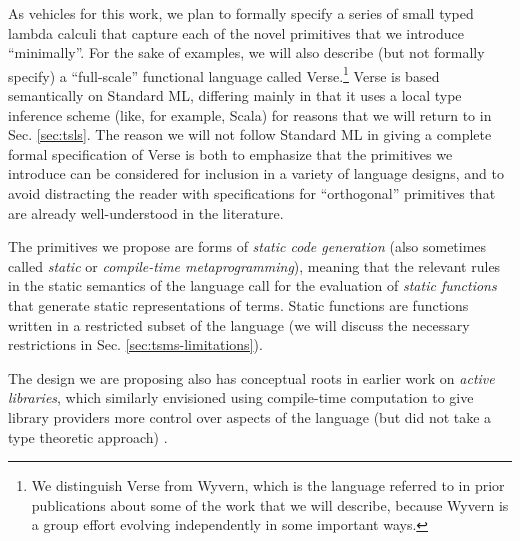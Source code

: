 As vehicles for this work, we plan to formally specify a series of small typed lambda calculi that capture each of the novel primitives that we introduce ``minimally''. For the sake of examples, we will also describe (but not formally specify) a ``full-scale'' functional language called Verse.\footnote{We distinguish Verse from Wyvern, which is the language referred to in prior publications about some of the work that we will describe, because Wyvern is a group effort evolving independently in some important ways.} Verse is based semantically on Standard ML, differing mainly in that it uses a local type inference scheme \cite{Pierce:2000:LTI:345099.345100} (like, for example, Scala) for reasons that we will return to in Sec. \ref{sec:tsls}. The reason we will not follow Standard ML \cite{mthm97-for-dart} in giving a complete formal specification of Verse is both to emphasize that the primitives we introduce can be considered for inclusion in a variety of language designs, and to avoid distracting the reader with specifications for ``orthogonal'' primitives that are already well-understood in the literature. %

The primitives we propose are forms of \emph{static code generation} (also sometimes called \emph{static} or \emph{compile-time metaprogramming}), meaning that the relevant rules in the static semantics of the language call for the evaluation of \emph{static functions} that generate static representations of terms. Static functions are functions written in a restricted subset of the language (we will discuss the necessary restrictions in Sec. \ref{sec:tsms-limitations}).%

The design we are proposing also has conceptual roots in earlier work on \emph{active libraries}, which similarly envisioned using compile-time computation to give library providers more control over aspects of the language (but did not take a type theoretic approach) \cite{active-libraries-thesis}. %


